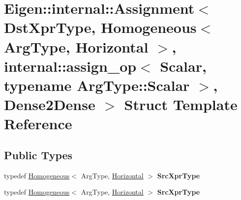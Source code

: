 \hypertarget{struct_eigen_1_1internal_1_1_assignment_3_01_dst_xpr_type_00_01_homogeneous_3_01_arg_type_00_01_bd4940a657c6f656a2015456f5ba4803}{}\section{Eigen\+:\+:internal\+:\+:Assignment$<$ Dst\+Xpr\+Type, Homogeneous$<$ Arg\+Type, Horizontal $>$, internal\+:\+:assign\+\_\+op$<$ Scalar, typename Arg\+Type\+:\+:Scalar $>$, Dense2\+Dense $>$ Struct Template Reference}
\label{struct_eigen_1_1internal_1_1_assignment_3_01_dst_xpr_type_00_01_homogeneous_3_01_arg_type_00_01_bd4940a657c6f656a2015456f5ba4803}
\subsection*{Public Types}
\begin{DoxyCompactItemize}
\item 
\mbox{\label{struct_eigen_1_1internal_1_1_assignment_3_01_dst_xpr_type_00_01_homogeneous_3_01_arg_type_00_01_bd4940a657c6f656a2015456f5ba4803_a97ed740eba73853edafaa9293f2e30bf}} 
typedef \hyperlink{group___geometry___module_class_eigen_1_1_homogeneous}{Homogeneous}$<$ Arg\+Type, \hyperlink{group__enums_ggad49a7b3738e273eb00932271b36127f7aae8a16b3b9272683c1162915f6d892be}{Horizontal} $>$ {\bfseries Src\+Xpr\+Type}
\item 
\mbox{\label{struct_eigen_1_1internal_1_1_assignment_3_01_dst_xpr_type_00_01_homogeneous_3_01_arg_type_00_01_bd4940a657c6f656a2015456f5ba4803_a97ed740eba73853edafaa9293f2e30bf}} 
typedef \hyperlink{group___geometry___module_class_eigen_1_1_homogeneous}{Homogeneous}$<$ Arg\+Type, \hyperlink{group__enums_ggad49a7b3738e273eb00932271b36127f7aae8a16b3b9272683c1162915f6d892be}{Horizontal} $>$ {\bfseries Src\+Xpr\+Type}
\end{DoxyCompactItemize}
